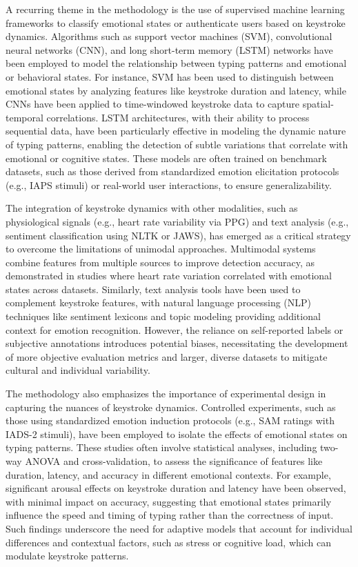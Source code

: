 \documentclass[conference]{IEEEtran}
\begin{document}
A recurring theme in the methodology is the use of supervised machine learning frameworks to classify emotional states or authenticate users based on keystroke dynamics. Algorithms such as support vector machines (SVM), convolutional neural networks (CNN), and long short-term memory (LSTM) networks have been employed to model the relationship between typing patterns and emotional or behavioral states. For instance, SVM has been used to distinguish between emotional states by analyzing features like keystroke duration and latency, while CNNs have been applied to time-windowed keystroke data to capture spatial-temporal correlations. LSTM architectures, with their ability to process sequential data, have been particularly effective in modeling the dynamic nature of typing patterns, enabling the detection of subtle variations that correlate with emotional or cognitive states. These models are often trained on benchmark datasets, such as those derived from standardized emotion elicitation protocols (e.g., IAPS stimuli) or real-world user interactions, to ensure generalizability.  

The integration of keystroke dynamics with other modalities, such as physiological signals (e.g., heart rate variability via PPG) and text analysis (e.g., sentiment classification using NLTK or JAWS), has emerged as a critical strategy to overcome the limitations of unimodal approaches. Multimodal systems combine features from multiple sources to improve detection accuracy, as demonstrated in studies where heart rate variation correlated with emotional states across datasets. Similarly, text analysis tools have been used to complement keystroke features, with natural language processing (NLP) techniques like sentiment lexicons and topic modeling providing additional context for emotion recognition. However, the reliance on self-reported labels or subjective annotations introduces potential biases, necessitating the development of more objective evaluation metrics and larger, diverse datasets to mitigate cultural and individual variability.  

The methodology also emphasizes the importance of experimental design in capturing the nuances of keystroke dynamics. Controlled experiments, such as those using standardized emotion induction protocols (e.g., SAM ratings with IADS-2 stimuli), have been employed to isolate the effects of emotional states on typing patterns. These studies often involve statistical analyses, including two-way ANOVA and cross-validation, to assess the significance of features like duration, latency, and accuracy in different emotional contexts. For example, significant arousal effects on keystroke duration and latency have been observed, with minimal impact on accuracy, suggesting that emotional states primarily influence the speed and timing of typing rather than the correctness of input. Such findings underscore the need for adaptive models that account for individual differences and contextual factors, such as stress or cognitive load, which can modulate keystroke patterns.  
\end{document}
